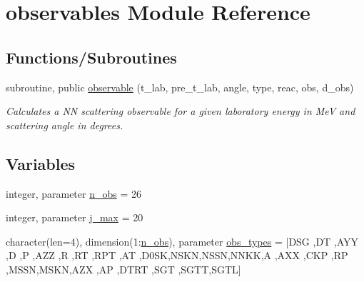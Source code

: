 \hypertarget{namespaceobservables}{}\section{observables Module Reference}
\label{namespaceobservables}
\subsection*{Functions/\+Subroutines}
\begin{DoxyCompactItemize}
\item 
subroutine, public \hyperlink{namespaceobservables_a82a92bf8aed4802ad0e9d4203e1e4314}{observable} (t\+\_\+lab, pre\+\_\+t\+\_\+lab, angle, type, reac, obs, d\+\_\+obs)
\begin{DoxyCompactList}\small\item\em Calculates a NN scattering observable for a given laboratory energy in MeV and scattering angle in degrees. \end{DoxyCompactList}\end{DoxyCompactItemize}
\subsection*{Variables}
\begin{DoxyCompactItemize}
\item 
integer, parameter \hyperlink{namespaceobservables_af01978bb96f8f41956fee58691edf7fc}{n\+\_\+obs} = 26
\item 
integer, parameter \hyperlink{namespaceobservables_a631bf3be23b16de8f578e6820180f71b}{j\+\_\+max} = 20
\item 
character(len=4), dimension(1\+:\hyperlink{namespaceobservables_af01978bb96f8f41956fee58691edf7fc}{n\+\_\+obs}), parameter \hyperlink{namespaceobservables_a90f1315ec196e65b251b3c25e597f972}{obs\+\_\+types} = \mbox{[}\textquotesingle{}D\+SG \textquotesingle{},\textquotesingle{}DT \textquotesingle{},\textquotesingle{}A\+YY \textquotesingle{},\textquotesingle{}D \textquotesingle{},\textquotesingle{}P \textquotesingle{},\textquotesingle{}A\+ZZ \textquotesingle{},\textquotesingle{}R \textquotesingle{} ,\textquotesingle{}RT \textquotesingle{},\textquotesingle{}R\+PT \textquotesingle{},\textquotesingle{}AT \textquotesingle{},\textquotesingle{}D0\+SK\textquotesingle{},\textquotesingle{}N\+S\+KN\textquotesingle{},\textquotesingle{}N\+S\+SN\textquotesingle{},\textquotesingle{}N\+N\+KK\textquotesingle{},\textquotesingle{}A \textquotesingle{} ,\textquotesingle{}A\+XX \textquotesingle{},\textquotesingle{}C\+KP \textquotesingle{},\textquotesingle{}RP \textquotesingle{},\textquotesingle{}M\+S\+SN\textquotesingle{},\textquotesingle{}M\+S\+KN\textquotesingle{},\textquotesingle{}A\+ZX \textquotesingle{},\textquotesingle{}AP \textquotesingle{},\textquotesingle{}D\+T\+RT\textquotesingle{} ,\textquotesingle{}S\+GT \textquotesingle{},\textquotesingle{}S\+G\+TT\textquotesingle{},\textquotesingle{}S\+G\+TL\textquotesingle{}\mbox{]}
\end{DoxyCompactItemize}


